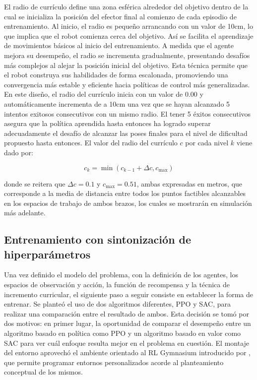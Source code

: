\begin{enumerate}
	El radio de currículo define una zona esférica alrededor del objetivo dentro de la cual se inicializa la posición del efector final al comienzo de cada episodio de entrenamiento. Al inicio, el radio es pequeño arrancando con un valor de 10cm, lo que implica que el robot comienza cerca del objetivo. Así se facilita el aprendizaje de movimientos básicos al inicio del entrenamiento. A medida que el agente mejora su desempeño, el radio se incrementa gradualmente, presentando desafíos más complejos al alejar la posición inicial del objetivo. Esta técnica permite que el robot construya sus habilidades de forma escalonada, promoviendo una convergencia más estable y eficiente hacia políticas de control más generalizadas.\\
	
	En este diseño, el radio del currículo inicia con un valor de 0.00 y automáticamente incrementa de a 10cm una vez que se hayan alcanzado 5 intentos exitosos consecutivos con un mismo radio. El tener 5 éxitos consecutivos asegura que la política aprendida hasta entonces ha logrado superar adecuadamente el desafío de alcanzar las poses finales para el nivel de dificultad propuesto hasta entonces. El valor del radio del currículo $c$ por cada nivel $k$ viene dado por:
	
	$$
		c_k = \min(c_{k-1}+\Delta c, c_{\max})
	$$
	
	donde se reitera que $\Delta c = 0.1$ y $c_{\max} = 0.51$, ambas expresadas en metros, que corresponde a la media de distancia entre todos los puntos factibles alcanzables en los espacios de trabajo de ambos brazos, los cuales se mostrarán en simulación más adelante.
	
\end{enumerate}


\subsection{Entrenamiento con sintonización de hiperparámetros}

Una vez definido el modelo del problema, con la definición de los agentes, los espacios de observación y acción, la función de recompensa y la técnica de incremento curricular, el siguiente paso a seguir consiste en establecer la forma de entrenar. Se planteó el uso de dos algoritmos diferentes, PPO y SAC, para realizar una comparación entre el resultado de ambos. Esta decisión se tomó por dos motivos: en primer lugar, la oportunidad de comparar el desempeño entre un algoritmo basado en política como PPO y un algoritmo basado en valor como SAC para ver cuál enfoque resulta mejor en el problema en cuestión. El montaje del entorno aprovechó el ambiente orientado al RL Gymnasium introducido por \textcite{towers2024gymnasium}, que permite programar entornos personalizados acorde al planteamiento conceptual de los mismos.\\

